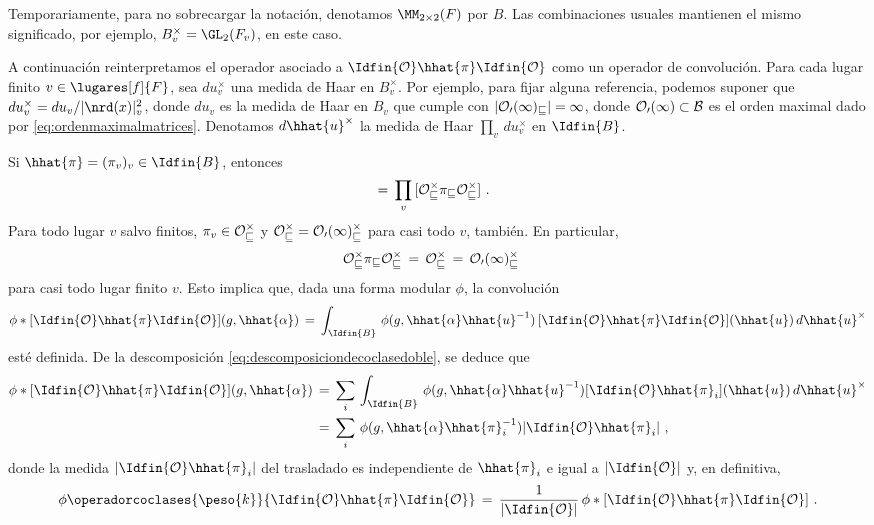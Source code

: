 Temporariamente, para no sobrecargar la notaci\'{o}n, denotamos
$\MM_{2\times 2}(F)$ por $B$. Las combinaciones usuales mantienen el mismo
significado, por ejemplo, $B_{v}^{\times}=\GL_{2}(F_{v})$, en este caso.

A continuaci\'{o}n reinterpretamos el operador asociado a
$\Idfin{\cal{O}}\hhat{\pi}\Idfin{\cal{O}}$ como un operador de convoluci\'{o}n.
Para cada lugar finito $v\in\lugares[f]{F}$, sea $du_{v}^{\times}$ una
medida de Haar en $B_{v}^{\times}$. Por ejemplo, para fijar alguna referencia,
podemos suponer que $du_{v}^{\times}=du_{v}/|\nrd(x)|_{v}^{2}$, donde $du_{v}$
es la medida de Haar en $B_{v}$ que cumple con $|\cal{O}_{0}(1)_{v}|=1$, donde
$\cal{O}_{0}(1)\subset B$ es el orden maximal dado por
\eqref{eq:ordenmaximalmatrices}. Denotamos $d\hhat{u}^{\times}$ la medida de
Haar $\prod_{v}\,du_{v}^{\times}$ en $\Idfin{B}$.

Si $\hhat{\pi}=(\pi_{v})_{v}\in\Idfin{B}$, entonces
\begin{align*}
	[\Idfin{\cal{O}}\hhat{\pi}\Idfin{\cal{O}}] & \,=\,
		\prod_{v}\,[\cal{O}_{v}^{\times}\pi_{v}\cal{O}_{v}^{\times}]
	\text{ .}
\end{align*}
%
Para todo lugar $v$ salvo finitos, $\pi_{v}\in\cal{O}_{v}^{\times}$ y
$\cal{O}_{v}^{\times}=\cal{O}_{0}(1)_{v}^{\times}$ para casi todo $v$,
tambi\'{e}n. En particular,
\begin{align*}
	\cal{O}_{v}^{\times}\pi_{v}\cal{O}_{v}^{\times} & \,=\,
		\cal{O}_{v}^{\times}\,=\,
		\cal{O}_{0}(1)_{v}^{\times}
\end{align*}
%
para casi todo lugar finito $v$. Esto implica que, dada una forma modular
$\phi$, la convoluci\'{o}n
\begin{equation}
	\label{eq:operadordecoclasedobledehilbertconvolucion}
	\phi * [\Idfin{\cal{O}}\hhat{\pi}\Idfin{\cal{O}}] (g,\hhat{\alpha})
		\,=\, \int_{\Idfin{B}}\,\phi(g,\hhat{\alpha}\hhat{u}^{-1})\,
			[\Idfin{\cal{O}}\hhat{\pi}\Idfin{\cal{O}}](\hhat{u})\,
			d\hhat{u}^{\times}
\end{equation}
%
est\'{e} definida. De la descomposici\'{o}n
\eqref{eq:descomposiciondecoclasedoble}, se deduce que
\begin{align*}
	\phi * [\Idfin{\cal{O}}\hhat{\pi}\Idfin{\cal{O}}](g,\hhat{\alpha})
	& \,=\,\sum_{i}\,\int_{\Idfin{B}}\,
		\phi(g,\hhat{\alpha}\hhat{u}^{-1})
			[\Idfin{\cal{O}}\hhat{\pi}_{i}](\hhat{u})\,
			d\hhat{u}^{\times} \\
	& \,=\, \sum_{i}\,\phi(g,\hhat{\alpha}\hhat{\pi}_{i}^{-1})
		|\Idfin{\cal{O}}\hhat{\pi}_{i}|
	\text{ ,}
\end{align*}
%
donde la medida $|\Idfin{\cal{O}}\hhat{\pi}_{i}|$ del trasladado es
independiente de $\hhat{\pi}_{i}$ e igual a $|\Idfin{\cal{O}}|$ y, en
definitiva,
\begin{equation}
	\label{eq:igualdadentreoperadordecoclasedobleyconvolucion}
	\phi\operadorcoclases{\peso{k}}{%
			\Idfin{\cal{O}}\hhat{\pi}\Idfin{\cal{O}}}
		\,=\,\frac{1}{|\Idfin{\cal{O}}|}\,
			\phi * [\Idfin{\cal{O}}\hhat{\pi}\Idfin{\cal{O}}]
	\text{ .}
\end{equation}
%

